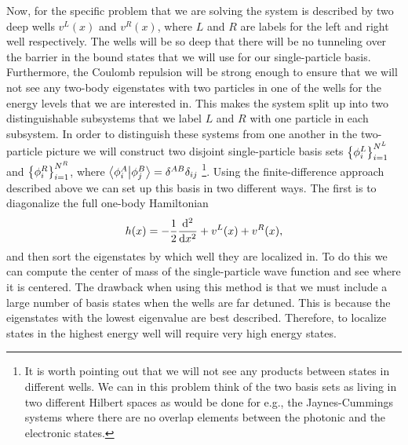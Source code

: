 \documentclass[twocolumn,superscriptaddress,unsortedaddress,
 amsmath,amssymb,
 aps,
]{revtex4-2}
\begin{document}
        Now, for the specific problem that  we are solving the system is described
        by two deep wells $v^{L}(x)$ and $v^{R}(x)$, where $L$ and $R$ are labels
        for the left and right well respectively.
        The wells will be so deep that there will be no tunneling over the
        barrier in the bound states that we will use for our single-particle
        basis.
        Furthermore, the Coulomb repulsion will be strong enough to ensure that
        we will not see any two-body eigenstates with two particles in one of
        the wells for the energy levels that we are interested in.
        This makes the system split up into two distinguishable subsystems
        that we label $L$ and $R$ with one particle in each subsystem.
        In order to distinguish these systems from one another in the
        two-particle picture we will construct two disjoint single-particle
        basis sets $\qty{\phi^{L}_{i}}_{i = 1}^{N^L}$ and
        $\qty{\phi^{R}_{i}}_{i = 1}^{N^R}$, where
        $\braket{\phi^{A}_{i}}{\phi^{B}_{j}} = \delta^{AB} \delta_{ij}$
        \footnote{
            It is worth pointing out that we will not see any products
            between states in different wells.
            We can in this problem think of the two basis sets as living in
            two different Hilbert spaces as would be done for e.g., the
            Jaynes-Cummings systems where there are no overlap elements
            between the photonic and the electronic states.
        }.
        Using the finite-difference approach described above we can set up this
        basis in two different ways.
        The first is to diagonalize the full one-body Hamiltonian
        \begin{align*}
            h(x) = -\frac{1}{2} \dv[2]{}{x} + v^{L}(x) + v^{R}(x),
        \end{align*}
        and then sort the eigenstates by which well they are localized in.
        To do this we can compute the center of mass of the single-particle
        wave function and see where it is centered.
        The drawback when using this method is that we must include a large
        number of basis states when the wells are far detuned.
        This is because the eigenstates with the lowest eigenvalue are best
        described.
        Therefore, to localize states in the highest energy well will require
        very high energy states.
\end{document}
